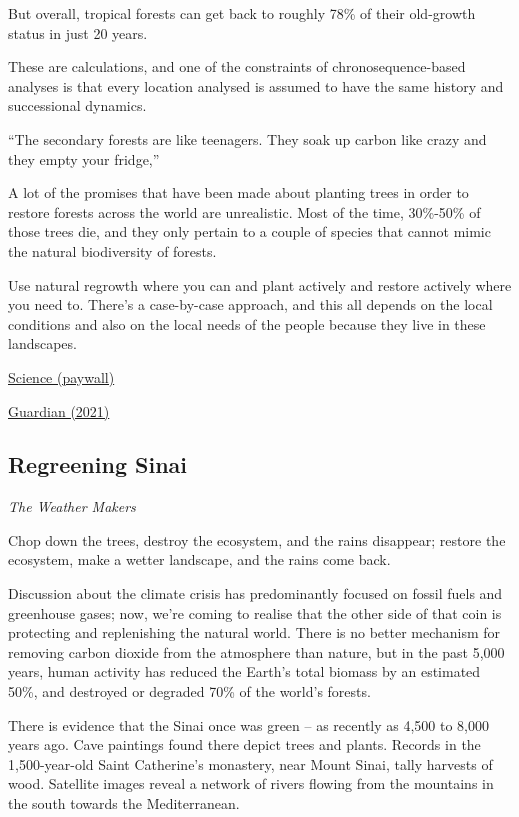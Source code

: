 \documentclass[
]{book}
\begin{document}
But overall, tropical forests can get back to roughly 78\% of their old-growth status in just 20 years.

These are calculations, and one of the constraints of chronosequence-based analyses is that every location analysed is assumed to have the same history and successional dynamics.

``The secondary forests are like teenagers. They soak up carbon like crazy and they empty your fridge,''

A lot of the promises that have been made about planting trees in order to restore forests across the world are unrealistic. Most of the time, 30\%-50\% of those trees die, and they only pertain to a couple of species that cannot mimic the natural biodiversity of forests.

Use natural regrowth where you can and plant actively and restore actively where you need to. There's a case-by-case approach, and this all depends on the local conditions and also on the local needs of the people because they live in these landscapes.

\href{http://www.science.org/doi/10.1126/science.abh3629}{Science (paywall)}

\href{https://www.theguardian.com/environment/2021/dec/09/tropical-forests-can-regenerate-in-just-20-years-without-human-interference}{Guardian (2021)}

\hypertarget{regreening-sinai}{%
\subsection{Regreening Sinai}\label{regreening-sinai}}

\emph{The Weather Makers}

Chop down the trees, destroy the ecosystem, and the rains disappear;
restore the ecosystem, make a wetter landscape, and the rains come back.

Discussion about the climate crisis has predominantly focused on fossil fuels and greenhouse gases;
now, we're coming to realise that the other side of that coin is
protecting and replenishing the natural world.
There is no better mechanism for removing carbon dioxide from the atmosphere than nature, but in the past 5,000 years, human activity has reduced the Earth's total biomass by an estimated 50\%, and destroyed or degraded 70\% of the world's forests.

There is evidence that the Sinai once was green -- as recently as 4,500 to 8,000 years ago. Cave paintings found there depict trees and plants. Records in the 1,500-year-old Saint Catherine's monastery, near Mount Sinai, tally harvests of wood. Satellite images reveal a network of rivers flowing from the mountains in the south towards the Mediterranean.
\end{document}

